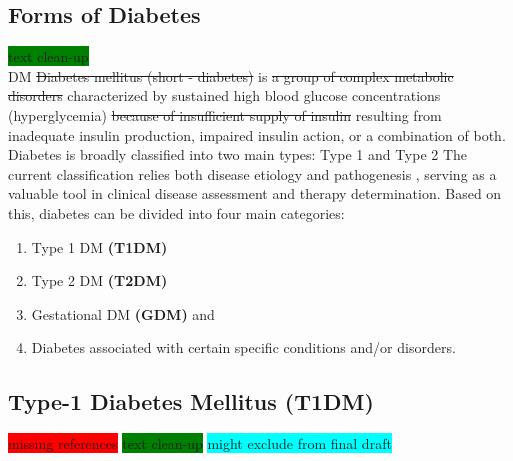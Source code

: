 \subsection{Forms of Diabetes} %
\label{sec:forsmDiabets}

\colorbox{green}{text clean-up} \\

DM \st{Diabetes mellitus (short - diabetes)} is \st{a group of complex metabolic disorders} characterized by sustained high blood glucose concentrations (hyperglycemia) \st{because of insufficient supply of insulin} resulting from inadequate insulin production, impaired insulin action, or a combination of both. Diabetes is broadly classified into two main types: Type 1 and Type 2  The current classification relies both disease etiology and pathogenesis \textbf{\cite{banday_pathophysiology_2020}}, serving as a valuable tool in clinical disease assessment and therapy determination. Based on this, diabetes can be divided into four main categories:\\
\begin{enumerate}
    \item Type 1 DM \textbf{(T1DM)}
    \item Type 2 DM \textbf{(T2DM)} 
    \item Gestational DM \textbf{(GDM)} and 
    \item Diabetes associated with certain specific conditions and/or disorders.
\end{enumerate}




\subsection{Type-1 Diabetes Mellitus (T1DM)}
\label{sec:t1dm}
\colorbox{red}{missing references} \colorbox{green}{text clean-up} \colorbox{cyan}{might exclude from final draft} \\

